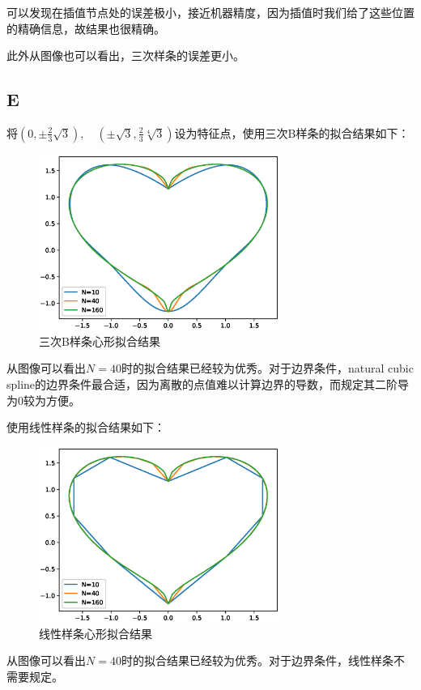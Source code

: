 \documentclass[12]{article}%
\begin{document}
        可以发现在插值节点处的误差极小，接近机器精度，因为插值时我们给了这些位置的精确信息，故结果也很精确。

        此外从图像也可以看出，三次样条的误差更小。
    
    \subsection{E}
        将$(0,\pm\frac{2}{3}\sqrt{3}),\quad(\pm\sqrt{3},\frac{2}{3}\sqrt[4]{3})$设为特征点，使用三次B样条的拟合结果如下：
        \begin{figure}[H]
            \centering
            \includegraphics[width=0.7\textwidth]{../pic/E.eps}
            \caption{三次B样条心形拟合结果}
        \end{figure}

        从图像可以看出$N=40$时的拟合结果已经较为优秀。对于边界条件，natural cubic spline的边界条件最合适，因为离散的点值难以计算边界的导数，而规定其二阶导为0较为方便。

        使用线性样条的拟合结果如下：
        \begin{figure}[H]
            \centering
            \includegraphics[width=0.7\textwidth]{../pic/E2.eps}
            \caption{线性样条心形拟合结果}
        \end{figure}

        从图像可以看出$N=40$时的拟合结果已经较为优秀。对于边界条件，线性样条不需要规定。
\end{document}

